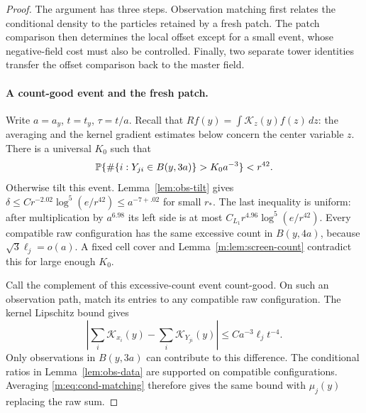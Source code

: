 \begin{proof}
The argument has three steps. Observation matching first relates
the conditional density to the particles retained by a fresh patch.
The patch comparison then determines the local offset except for a
small event, whose negative-field cost must also be controlled.
Finally, two separate tower identities transfer the offset comparison
back to the master field.

\paragraph{A count-good event and the fresh patch.}
Write $a=a_y$, $t=t_y$, $\tau=t/a$. Recall that
$Rf(y)=\int\mathcal K_z(y)f(z)\,dz$: the averaging and the kernel
gradient estimates below concern the center variable $z$.
There is a universal $K_0$ such that
\begin{equation}\label{m:eq:cond-observed-count}
 \mathbb P\{\#\{i:Y_{ji}\in B(y,3a)\}>K_0a^{-3}\}<r^{42}.
\end{equation}
Otherwise tilt this event. Lemma~\ref{lem:obs-tilt} gives
$\delta\le Cr^{-2.02}\log^5(e/r^{42})\le a^{-7+.02}$ for small
$r_*$. The last inequality is uniform: after multiplication by
$a^{6.98}$ its left side is at most
$C_{L_1}r^{4.96}\log^5(e/r^{42})$.
Every compatible raw configuration has the same excessive count in
$B(y,4a)$, because $\sqrt3\ell_j=o(a)$.
A fixed cell cover and Lemma~\ref{m:lem:screen-count} contradict this
for large enough $K_0$.

Call the complement of this excessive-count event count-good. On
such an observation path, match its entries to any compatible raw
configuration. The kernel Lipschitz bound gives
\begin{equation}\label{m:eq:cond-matching}
 \left|\sum_i\mathcal K_{x_i}(y)
             -\sum_i\mathcal K_{Y_{ji}}(y)\right|
       \le Ca^{-3}\ell_jt^{-4}.
\end{equation}
Only observations in $B(y,3a)$ can contribute to this difference.
The conditional ratios in Lemma~\ref{lem:obs-data} are supported on
compatible configurations. Averaging \eqref{m:eq:cond-matching}
therefore gives the same bound with $\mu_j(y)$ replacing the raw sum.


\end{proof}
